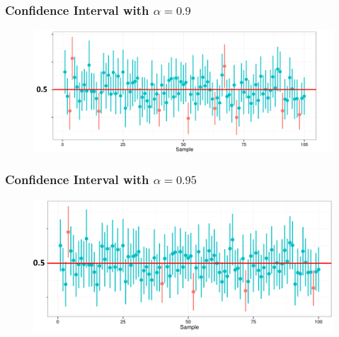 \documentclass[12pt]{beamer}\usepackage[]{graphicx}\usepackage[]{color}
\begin{document}
\begin{frame}\large
\frametitle{Confidence Interval with $\alpha=0.9$}

\begin{figure}
\hspace*{-0.8cm} \includegraphics[width=1\paperwidth]{./Images/ci90.png}
\end{figure}
\end{frame}


\begin{frame}\large
\frametitle{Confidence Interval with $\alpha=0.95$}

\begin{figure}
\hspace*{-0.8cm}  \includegraphics[width=0.95\paperwidth]{./Images/ci95.png}
\end{figure}
\end{frame}

\end{document}
